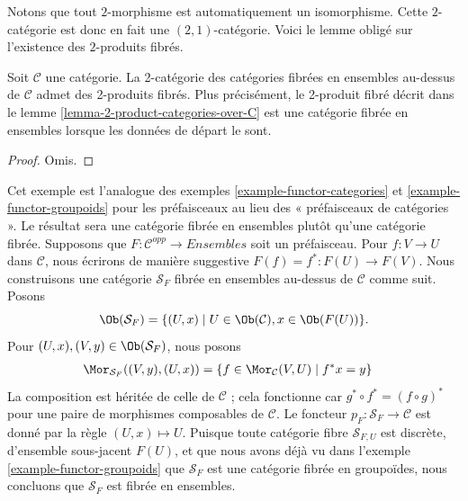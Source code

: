 \noindent
Notons que tout $2$-morphisme est automatiquement un isomorphisme.
Cette $2$-catégorie est donc en fait une $(2, 1)$-catégorie.
Voici le lemme obligé sur l'existence des $2$-produits fibrés.

\begin{lemma}
\label{lemma-2-product-categories-fibred-sets}
Soit $\mathcal{C}$ une catégorie.
La 2-catégorie des catégories fibrées en ensembles au-dessus de $\mathcal{C}$
admet des 2-produits fibrés. Plus précisément, le 2-produit fibré décrit dans le
lemme \ref{lemma-2-product-categories-over-C}
est une catégorie fibrée en ensembles lorsque les données de départ le sont.
\end{lemma}

\begin{proof}
Omis.
\end{proof}

\begin{example}
\label{example-presheaf}
Cet exemple est l'analogue des
exemples \ref{example-functor-categories} et
\ref{example-functor-groupoids}
pour les préfaisceaux au lieu des « préfaisceaux de catégories ».
Le résultat sera une catégorie fibrée en ensembles plutôt qu'une catégorie fibrée.
Supposons que $F : \mathcal{C}^{opp} \to \textit{Ensembles}$ soit un préfaisceau.
Pour $f : V \to U$ dans $\mathcal{C}$, nous écrirons de manière suggestive
$F(f) = f^\ast : F(U) \to F(V)$.
Nous construisons une catégorie $\mathcal{S}_F$ fibrée en ensembles au-dessus de
$\mathcal{C}$ comme suit. Posons
$$
\Ob(\mathcal{S}_F) =
\{(U, x) \mid U \in \Ob(\mathcal{C}), x \in \Ob(F(U))\}.
$$
Pour $(U, x), (V, y) \in \Ob(\mathcal{S}_F)$, nous posons
\begin{align*}
\Mor_{\mathcal{S}_F}((V, y), (U, x))
& =
\{f \in \Mor_\mathcal{C}(V, U) \mid f^*x = y\}
\end{align*}
La composition est héritée de celle de $\mathcal{C}$ ; cela fonctionne car
$g^\ast \circ f^\ast = (f \circ g)^\ast$
pour une paire de morphismes composables de $\mathcal{C}$.
Le foncteur $p_F : \mathcal{S}_F \to \mathcal{C}$
est donné par la règle $(U, x) \mapsto U$.
Puisque toute catégorie fibre $\mathcal{S}_{F, U}$ est discrète, d'ensemble
sous-jacent $F(U)$, et que nous avons déjà vu dans
l'exemple \ref{example-functor-groupoids}
que $\mathcal{S}_F$ est une catégorie fibrée en groupoïdes,
nous concluons que $\mathcal{S}_F$ est fibrée en ensembles.
\end{example}

